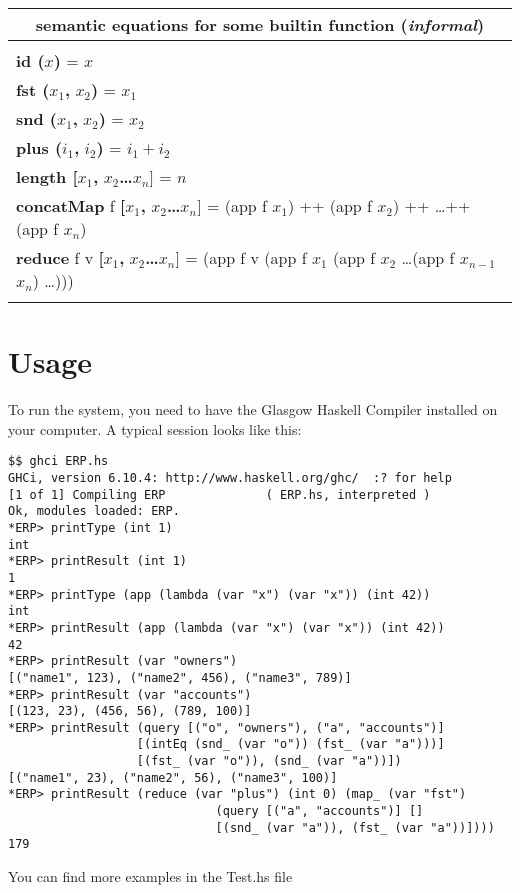 \documentclass[10pt, oneside]{article}
\begin{document}
\begin{center}
\begin{tabular}{l}
\multicolumn{1}{c}{semantic equations for some builtin function (\emph{informal})}\\
\hline\\

\textbf{id (}$x$\textbf{)} = $x$\\

\textbf{fst (}$x_1$\textbf{,} $x_2$\textbf{)} = $x_1$\\

\textbf{snd (}$x_1$\textbf{,} $x_2$\textbf{)} = $x_2$\\

\textbf{plus (}$i_1$\textbf{,} $i_2$\textbf{)} = $i_1 + i_2$\\

\textbf{length [}$x_1$\textbf{,} $x_2$\textbf \ldots $x_n${]} = $n$\\

\textbf{concatMap} f \textbf{[}$x_1$\textbf{,} $x_2$\textbf \ldots $x_n${]} = (app f $x_1$) ++ (app f $x_2$) ++ \ldots ++ (app f $x_n$)\\

\textbf{reduce} f v \textbf{[}$x_1$\textbf{,} $x_2$\textbf \ldots $x_n${]} = (app f v (app f $x_1$ (app f $x_2$ \ldots (app f $x_{n-1}$ $x_n$) \ldots )))\\

\\
\end{tabular}
\end{center}

\pagebreak

\section{Usage}

To run the system, you need to have the Glasgow Haskell Compiler installed on your computer. A typical session looks like this:

\begin{verbatim}
$$ ghci ERP.hs                                                                                                                 GHCi, version 6.10.4: http://www.haskell.org/ghc/  :? for help
[1 of 1] Compiling ERP              ( ERP.hs, interpreted )
Ok, modules loaded: ERP.
*ERP> printType (int 1)
int
*ERP> printResult (int 1)
1
*ERP> printType (app (lambda (var "x") (var "x")) (int 42))
int
*ERP> printResult (app (lambda (var "x") (var "x")) (int 42))
42
*ERP> printResult (var "owners")
[("name1", 123), ("name2", 456), ("name3", 789)]
*ERP> printResult (var "accounts")
[(123, 23), (456, 56), (789, 100)]
*ERP> printResult (query [("o", "owners"), ("a", "accounts")]
                  [(intEq (snd_ (var "o")) (fst_ (var "a")))]
                  [(fst_ (var "o")), (snd_ (var "a"))])
[("name1", 23), ("name2", 56), ("name3", 100)]
*ERP> printResult (reduce (var "plus") (int 0) (map_ (var "fst")
                             (query [("a", "accounts")] []
                             [(snd_ (var "a")), (fst_ (var "a"))])))
179
\end{verbatim}

You can find more examples in the Test.hs file

\end{document}
